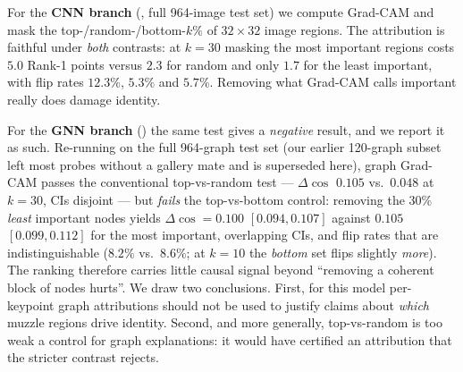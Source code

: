\documentclass[11pt]{article}
\begin{document}
For the \textbf{CNN branch} (, full 964-image test set) we compute Grad-CAM and mask the top-/random-/bottom-$k\%$ of $32\times32$ image regions. The attribution is faithful under \emph{both} contrasts: at $k{=}30$ masking the most important regions costs $5.0$ Rank-1 points versus $2.3$ for random and only $1.7$ for the least important, with flip rates $12.3\%$, $5.3\%$ and $5.7\%$. Removing what Grad-CAM calls important really does damage identity.

For the \textbf{GNN branch} () the same test gives a \emph{negative} result, and we report it as such. Re-running on the full 964-graph test set (our earlier 120-graph subset left most probes without a gallery mate and is superseded here), graph Grad-CAM passes the conventional top-vs-random test --- $\Delta\cos$ $0.105$ vs.\ $0.048$ at $k{=}30$, CIs disjoint --- but \emph{fails} the top-vs-bottom control: removing the 30\% \emph{least} important nodes yields $\Delta\cos = 0.100$ $[0.094,0.107]$ against $0.105$ $[0.099,0.112]$ for the most important, overlapping CIs, and flip rates that are indistinguishable ($8.2\%$ vs.\ $8.6\%$; at $k{=}10$ the \emph{bottom} set flips slightly \emph{more}). The ranking therefore carries little causal signal beyond ``removing a coherent block of nodes hurts''. We draw two conclusions. First, for this model per-keypoint graph attributions should not be used to justify claims about \emph{which} muzzle regions drive identity. Second, and more generally, top-vs-random is too weak a control for graph explanations: it would have certified an attribution that the stricter contrast rejects.
\end{document}
